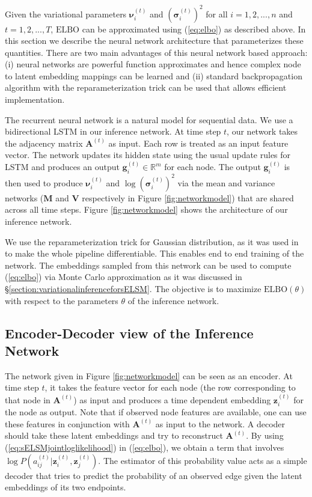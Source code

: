 \documentclass[letterpaper]{article}
\begin{document}
Given the variational parameters $\bm{\nu}_i^{(t)}$ and ${(\bm{\sigma}_i^{(t)})^2}$ for all ${i} = 1, 2, ..., {n}$ and ${t} = 1, 2, ..., {T}$, $\mathrm{ELBO}$ can be approximated using (\ref{eq:elbo}) as described above. In this section we describe the neural network architecture that parameterizes these quantities. There are two main advantages of this neural network based approach: (i) neural networks are powerful function approximates and hence complex node to latent embedding mappings can be learned and (ii) standard backpropagation algorithm with the reparameterization trick \cite{KingmaEtAl:2013:AutoEncodingVariationalBayes} can be used that allows efficient implementation.

The recurrent neural network is a natural model for sequential data. We use a bidirectional LSTM in our inference network. At time step ${t}$, our network takes the adjacency matrix $\mathbf{A}^{(t)}$ as input. Each row is treated as an input feature vector. The network updates its hidden state using the usual update rules for LSTM and produces an output $\mathbf{g}_i^{(t)} \in \mathbb{R}^{m}$ for each node. The output $\mathbf{g}_i^{(t)}$ is then used to produce $\bm{\nu}_i^{(t)}$ and $\log {(\bm{\sigma}_i^{(t)})^2}$ via the mean and variance networks (${\mathbf{M}}$ and ${\mathbf{V}}$ respectively in Figure \ref{fig:networkmodel}) that are shared across all time steps. Figure \ref{fig:networkmodel} shows the architecture of our inference network.

We use the reparameterization trick for Gaussian distribution, as it was used in \cite{KingmaEtAl:2013:AutoEncodingVariationalBayes} to make the whole pipeline differentiable. This enables end to end training of the network. The embeddings sampled from this network can be used to compute ({\ref{eq:elbo}}) via Monte Carlo approximation as it was discussed in \S \ref{section:variationalinferenceforsELSM}. The objective is to maximize $\mathrm{ELBO}(\theta)$ with respect to the parameters $\theta$ of the inference network.


\subsection{Encoder-Decoder view of the Inference Network}
\label{section:encoderdecoderviewofinferencenetwork}
The network given in Figure \ref{fig:networkmodel} can be seen as an encoder. At time step ${t}$, it takes the feature vector for each node (the row corresponding to that node in $\mathbf{A}^{(t)}$) as input and produces a time dependent embedding $\mathbf{z}_i^{(t)}$ for the node as output. Note that if observed node features are available, one can use these features in conjunction with $\mathbf{A}^{(t)}$ as input to the network. A decoder should take these latent embeddings and try to reconstruct $\mathbf{A}^{(t)}$. By using (\ref{eq:sELSMjointloglikelihood}) in (\ref{eq:elbo}), we obtain a term that involves $\log P({a_{ij}^{(t)}} | \mathbf{z}_{i}^{(t)}, \mathbf{z}_{j}^{(t)})$. The estimator of this probability value acts as a simple decoder that tries to predict the probability of an observed edge given the latent embeddings of its two endpoints.
\end{document}
